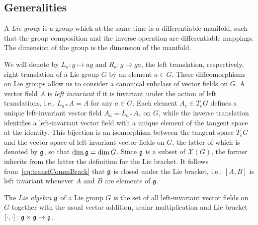 \documentclass[
final,
11pt,
a4paper,
DIV=11,
headinclude=true,
footinclude=false,
bibliography=totoc,
twoside=true,  %
BCOR=5mm
]{scrbook}
\begin{document}
\subsection{Generalities}

\begin{definition}
A \emph{Lie group} is a group which at the same time is 
a differentiable manifold, such that the group composition and 
the inverse operation are differentiable mappings. The dimension 
of the group is the dimension of the manifold.
\end{definition}

We will denote by $L_a : g \mapsto ag$ and $R_a : g \mapsto ga$, 
the left translation, respectively, right translation of a Lie 
group $G$ by an element $a \in G$. These diffeomorphisms on Lie 
groups allow us to consider a canonical subclass of vector fields 
on $G$. A vector field $A$ is \emph{left invariant} if it is 
invariant under the action of left translations, i.e., $L_{a*}A 
= A$ for any $a \in G$. Each element $A_e \in T_e G$ defines 
a unique left-invariant vector field $A_a = L_{a*}A_e$ on $G$, 
while the inverse translation identifies a left-invariant vector 
field with a unique element of the tangent space at the identity.  
This bijection is an isomorphism between the tangent space $T_e 
G$ and the vector space of left-invariant vector fields on $G$, 
the latter of which is denoted by $\mathfrak{g}$, so that $\dim\mathfrak{g} 
= \dim G$. Since $\mathfrak{g}$ is a subset of $\mathscr{X}(G)$, the 
former inherits from the latter the definition for the Lie 
bracket. It follows from~\eqref{eq:transfCommBrack} that $\mathfrak{g}$ 
is closed under the Lie bracket, i.e., $[A,B]$ is left invariant 
whenever $A$ and $B$ are elements of $\mathfrak{g}$.

\begin{definition}
The \emph{Lie algebra} $\mathfrak{g}$ of a Lie group $G$ is the set of 
all left-invariant vector fields on $G$ together with the usual 
vector addition, scalar multiplication and Lie bracket 
$[\cdot,\cdot] : \mathfrak{g} \times \mathfrak{g} \to \mathfrak{g}$.
\end{definition}
\end{document}
